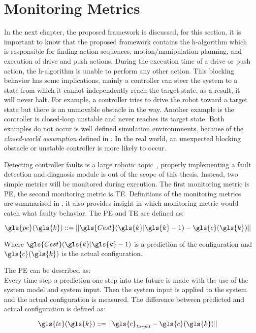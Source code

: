 \section{Monitoring Metrics}%
\label{sec:monitoring_metrics}
In the next chapter, the proposed framework is discussed, for this section, it is important to know that the proposed framework contains the \ac{h-algorithm} which is responsible for finding action sequences, motion/manipulation planning, and execution of drive and push actions. During the execution time of a drive or push action, the \acl{h-algorithm} is unable to perform any other action. This blocking behavior has some implications, mainly a controller can steer the system to a state from which it cannot independently reach the target state, as a result, it will never halt. For example, a controller tries to drive the robot toward a target state but there is an unmovable obstacle in the way. Another example is the controller is closed-loop unstable and never reaches its target state. Both examples do not occur is well defined simulation environmnents, because of the \textit{closed-world assumption} defined in . In the real world, an unexpected blocking obstacle or unstable controller is more likely to occur.\bs

Detecting controller faults is a large robotic topic~\cite{khalastchi_fault_2019}, properly implementing a fault detection and diagnosis module is out of the scope of this thesis. Instead, two simple metrics will be monitored during execution. The first monitoring metric is \ac{PE}, the second monitoring metric is \ac{TE}. Definitions of the monitoring metrics are summarised in , it also provides insight in which monitoring metric would catch what faulty behavior. The \ac{PE} and \ac{TE} are defined as:\bs

\[ \gls{pe}(\gls{k}) ::= ||\gls{Cest}(\gls{k}|\gls{k}-1) - \gls{c}(\gls{k})|| \]

Where $\gls{Cest}(\gls{k}|\gls{k}-1)$ is a prediction of the configuration and $\gls{c}(\gls{k})$ is the actual configuration.\bs

The \acl{PE} can be described as:\\
Every time step a prediction one step into the future is made with the use of the system model and system input. Then the system input is applied to the system and the actual configuration is measured. The difference between predicted and actual configuration is defined as:\bs

\[ \gls{te}(\gls{k}) ::= ||\gls{c}_\mathit{target} - \gls{c}(\gls{k})|| \]

